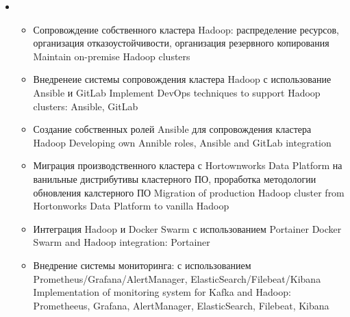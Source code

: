 \documentclass[11pt,a4paper,sans]{moderncv}        %
\begin{document}
{\begin{itemize}
\begin{itemize}
				{Участие в проектах для MS SQL Server}
				{Participation in projects for MS SQL Server}
      		\item {}
      			{Внедрение и сопровождение СУБД PostgreSQL в кластерном режиме, интеграция с Hadoop с использованием KafkaConnect и Debezium}
      			{Integration cluster PostgreSQL with Hadoop: Patroni}
		\end{itemize}
		\item {}
		\begin{itemize}
			\item {}
				{Сопровождение собственного кластера Hadoop: распределение ресурсов, организация отказоустойчивости, организация резервного копирования}
				{Maintain on-premise Hadoop clusters}
			\item {}
				{Внедренеие системы сопровождения кластера Hadoop с использование Ansible и GitLab}
				{Implement DevOps techniques to support Hadoop clusters: Ansible, GitLab}
			\item {}
				{Создание собственных ролей Ansible для сопровождения кластера Hadoop}
				{Developing own Annible roles, Ansible and GitLab integration}
			\item {}
				{Миграция производственного кластера с Hortownworks Data Platform на ванильные дистрибутивы кластерного ПО, проработка методологии обновления калстерного ПО}
				{Migration of production Hadoop cluster from Hortonworks Data Platform to vanilla Hadoop}
			\item {}
				{Интеграция Hadoop и Docker Swarm с использованием Portainer}
				{Docker Swarm and Hadoop integration: Portainer}
			\item {}
				{Внедрение системы мониторинга: с использованием Prometheus/Grafana/AlertManager, ElasticSearch/Filebeat/Kibana}
				{Implementation of monitoring system for Kafka and Hadoop: Prometheeus, Grafana, AlertManager, ElasticSearch, Filebeat, Kibana}
		\end{itemize}
	\end{itemize}
}
\end{document}
